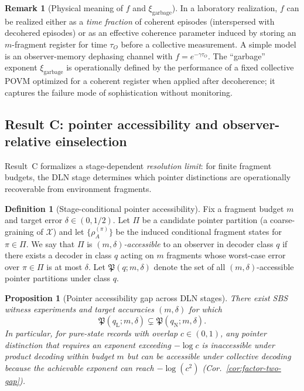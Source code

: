 \documentclass[11pt]{article}
\newcommand{\cX}{\mathcal{X}}
\newcommand{\1}{\mathbf{1}}
\newcommand{\QCBdist}{\xi}
\theoremstyle{definition}
\newtheorem{definition}{Definition}
\newtheorem{remark}{Remark}
\theoremstyle{plain}
\newtheorem{proposition}{Proposition}
\begin{document}
\begin{remark}[Physical meaning of $f$ and $\QCBdist_{\mathrm{garbage}}$]
In a laboratory realization, $f$ can be realized either as a \emph{time fraction} of coherent episodes (interspersed with decohered episodes) or as an effective coherence parameter induced by storing an $m$-fragment register for time $\tau_O$ before a collective measurement.
A simple model is an observer-memory dephasing channel with $f=e^{-\gamma \tau_O}$.
The ``garbage'' exponent $\QCBdist_{\mathrm{garbage}}$ is operationally defined by the performance of a fixed collective POVM optimized for a coherent register when applied after decoherence; it captures the failure mode of sophistication without monitoring.
\end{remark}

\subsection{Result C: pointer accessibility and observer-relative einselection}

Result~C formalizes a stage-dependent \emph{resolution limit}: for finite fragment budgets, the DLN stage determines which pointer distinctions are operationally recoverable from environment fragments.

\begin{definition}[Stage-conditional pointer accessibility]
\label{def:pointer-accessibility}
Fix a fragment budget $m$ and target error $\delta\in(0,1/2)$.
Let $\Pi$ be a candidate pointer partition (a coarse-graining of $\cX$) and let $\{\rho_{A}^{(\pi)}\}$ be the induced conditional fragment states for $\pi\in\Pi$.
We say that $\Pi$ is \emph{$(m,\delta)$-accessible} to an observer in decoder class $q$ if there exists a decoder in class $q$ acting on $m$ fragments whose worst-case error over $\pi\in\Pi$ is at most $\delta$.
Let $\mathfrak{P}(q;m,\delta)$ denote the set of all $(m,\delta)$-accessible pointer partitions under class $q$.
\end{definition}

\begin{proposition}[Pointer accessibility gap across DLN stages]
\label{prop:pointer-accessibility-gap}
There exist SBS witness experiments and target accuracies $(m,\delta)$ for which
\[
\mathfrak{P}(q_{\mathrm{L}};m,\delta)\subsetneq \mathfrak{P}(q_{\mathrm{N}};m,\delta).
\]
In particular, for pure-state records with overlap $c\in(0,1)$, any pointer distinction that requires an exponent exceeding $-\log c$ is inaccessible under product decoding within budget $m$ but can be accessible under collective decoding because the achievable exponent can reach $-\log(c^2)$ (Cor.~\ref{cor:factor-two-gap}).
\end{proposition}
\end{document}
